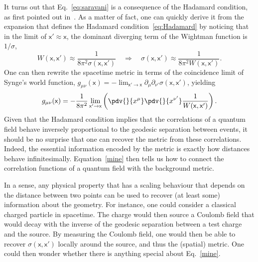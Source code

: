 \documentclass[letterpaper,12pt,titlepage,oneside,final]{book}
\newcommand{\mf}{\mathsf}%
\begin{document}
It turns out that Eq.~\eqref{eq:saravani} is a consequence of the Hadamard condition, as first pointed out in~\cite{geometry}. As a matter of fact, one can quickly derive it from the expansion that defines the Hadamard condition~\eqref{eq:Hadamard} by noticing that in the limit of $\mf x' \approx \mf x$, the dominant diverging term of the Wightman function is $1/\sigma$,
\begin{equation}
    W(\mf x, \mf x') \approx \frac{1}{8\pi^2 \sigma(\mf x, \mf x')} \quad \Rightarrow \quad \sigma(\mf x, \mf x') \approx \frac{1}{8\pi^2 W(\mf x,\mf x')}.
\end{equation}
One can then rewrite the spacetime metric in terms of the coincidence limit of Synge's world function, $g_{\mu\nu}(\mf x) = - \lim_{\mf x' \to \mf x} \partial_\mu \partial_{\nu'} \sigma(\mf x,\mf x')$, yielding
\begin{equation}\label{mine}
    g_{\mu\nu}(\mf x) =  -\frac{1}{8 \pi^2} \lim_{\mf x' \to \mf x} \left(\pdv{}{x^\mu}\pdv{}{x^{\nu'}}\frac{1}{W(\mf x, \mf x')}\right).
\end{equation}
Given that the Hadamard condition implies that the correlations of a quantum field behave inversely proportional to the geodesic separation between events, it should be no surprise that one can recover the metric from these correlations. Indeed, the essential information encoded by the metric is exactly how distances behave infinitesimally. Equation~\eqref{mine} then tells us how to connect the correlation functions of a quantum field with the background metric. 

In a sense, any physical property that has a scaling behaviour that depends on the distance between two points can be used to recover (at least some) information about the geometry. For instance, one could consider a classical charged particle in spacetime. The charge would then source a Coulomb field that would decay with the inverse of the geodesic separation between a test charge and the source. By measuring the Coulomb field, one would then be able to recover $\sigma(\mf x, \mf x')$ locally around the source, and thus the (spatial) metric. One could then wonder whether there is anything special about Eq.~\eqref{mine}.
\end{document}

